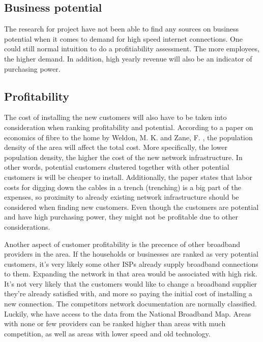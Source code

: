 \documentclass[twocolumn]{article}
\begin{document}
\subsection{Business potential}
\label{sub:Businesses}
The research for project have not been able to find any sources on business potential when it comes to demand for high speed internet connections. One could still normal intuition to do a profitiability assessment. The more employees, the higher demand. In addition, high yearly revenue will also be an indicator of purchasing power.

\subsection{Profitability}
\label{sub:Profitability}
The cost of installing the new customers will also have to be taken into consideration when ranking profitability and potential. According to a paper on economics of fibre to the home by Weldon, M. K. and Zane, F. \cite{Weldon2003-xq}, the population density of the area will affect the total cost. More specifically, the lower population density, the higher the cost of the new network infrastructure. In other words, potential customers clustered together with other potential customers is will be cheaper to install. Additionally, the paper states that labor costs for digging down the cables in a trench (trenching) is a big part of the expenses, so proximity to already existing network infrastructure should be considered when finding new customers.
Even though the customers are potential and have high purchasing power, they might not be profitable due to other considerations.

Another aspect of customer profitability is the precence of other broadband providers in the area. If the households or businesses are ranked as very potential customers, it's very likely some other ISPs already supply broadband connections to them. Expanding the network in that area would be associated with high risk. It's not very likely that the customers would like to change a broadband supplier they're already satisfied with, and more so paying the initial cost of installing a new connection. The competitors network documentation are normally classified. Luckily, whe have access to the data from the National Broadband Map. Areas with none or few providers can be ranked higher than areas with much competition, as well as areas with lower speed and old technology.
\end{document}
